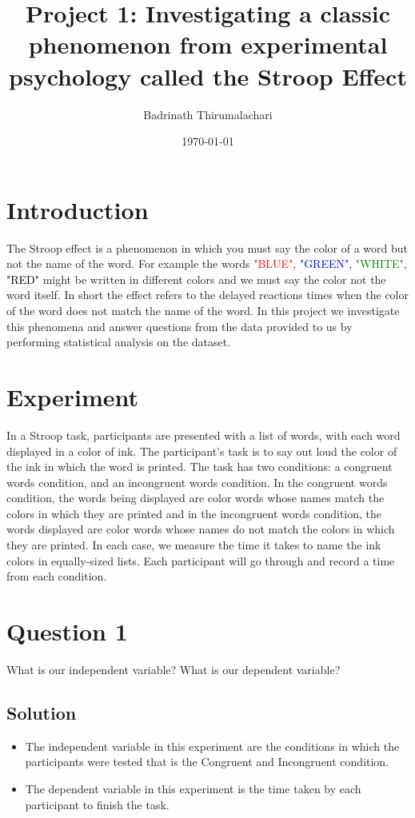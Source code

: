 \documentclass[12pt]{article}%
\begin{document}
\title{Project 1: Investigating a classic phenomenon from experimental psychology called the Stroop Effect}
\author{Badrinath Thirumalachari}
\date{\today}
\maketitle 
 

\section*{Introduction}

The Stroop effect is a phenomenon in which you must say the color of a word but not the name of the word. For example the words \textcolor{red}{"BLUE"}, \textcolor{blue}{"GREEN"}, \textcolor{green}{"WHITE"}, \textcolor{black}{"RED"} might be written in different colors and we must say the color not the word itself. In short the effect refers to the delayed reactions times when the color of the word does not match the name of the word. In this project we investigate this phenomena and answer questions from the data provided to us by performing statistical analysis on the dataset.

\section*{Experiment}

In a Stroop task, participants are presented with a list of words, with each word displayed in a color of ink. The participant's task is to say out loud the color of the ink in which the word is printed. The task has two conditions: a congruent words condition, and an incongruent words condition. In the congruent words condition, the words being displayed are color words whose names match the colors in which they are printed and in the incongruent words condition, the words displayed are color words whose names do not match the colors in which they are printed. In each case, we measure the time it takes to name the ink colors in equally-sized lists. Each participant will go through and record a time from each condition.

\section*{Question 1}

What is our independent variable? What is our dependent variable?

\subsection*{Solution}
\begin{itemize}
  \item The independent variable in this experiment are the conditions in which the participants were tested that is the Congruent and Incongruent condition.

  \item The dependent variable in this experiment is the time taken by each participant to finish the task.
\end{itemize}
\newpage
\end{document}
